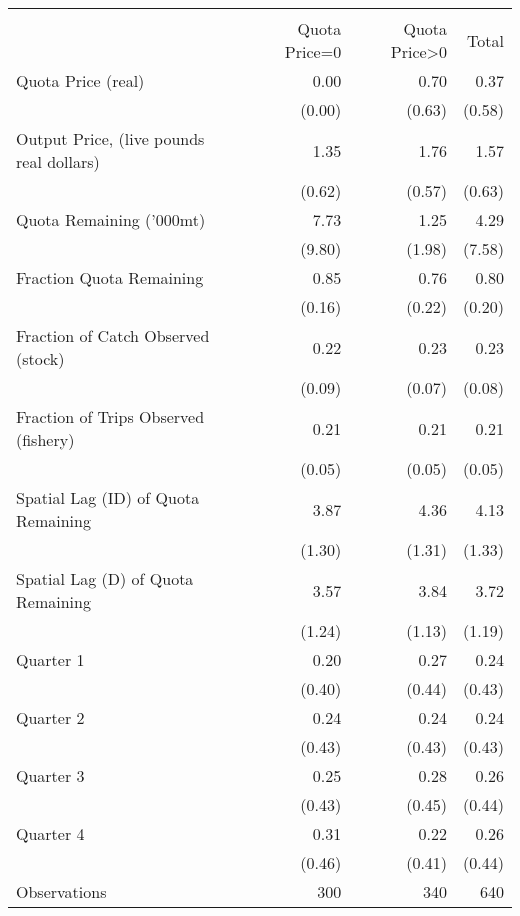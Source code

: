 \begin{tabular}{l*{3}{r}}
\hline\hline
                    &\multicolumn{3}{c}{}                  \\
                    &Quota Price=0&Quota Price>0&       Total\\
\hline
Quota Price (real)  &        0.00&        0.70&        0.37\\
                    &      (0.00)&      (0.63)&      (0.58)\\
Output Price, (live pounds real dollars)&        1.35&        1.76&        1.57\\
                    &      (0.62)&      (0.57)&      (0.63)\\
Quota Remaining ('000mt)&        7.73&        1.25&        4.29\\
                    &      (9.80)&      (1.98)&      (7.58)\\
Fraction Quota Remaining&        0.85&        0.76&        0.80\\
                    &      (0.16)&      (0.22)&      (0.20)\\
Fraction of Catch Observed (stock)&        0.22&        0.23&        0.23\\
                    &      (0.09)&      (0.07)&      (0.08)\\
Fraction of Trips Observed (fishery)&        0.21&        0.21&        0.21\\
                    &      (0.05)&      (0.05)&      (0.05)\\
Spatial Lag (ID) of Quota Remaining&        3.87&        4.36&        4.13\\
                    &      (1.30)&      (1.31)&      (1.33)\\
Spatial Lag (D) of Quota Remaining&        3.57&        3.84&        3.72\\
                    &      (1.24)&      (1.13)&      (1.19)\\
Quarter 1           &        0.20&        0.27&        0.24\\
                    &      (0.40)&      (0.44)&      (0.43)\\
Quarter 2           &        0.24&        0.24&        0.24\\
                    &      (0.43)&      (0.43)&      (0.43)\\
Quarter 3           &        0.25&        0.28&        0.26\\
                    &      (0.43)&      (0.45)&      (0.44)\\
Quarter 4           &        0.31&        0.22&        0.26\\
                    &      (0.46)&      (0.41)&      (0.44)\\
Observations        &      300&      340&    640        \\
\hline\hline
\end{tabular}
